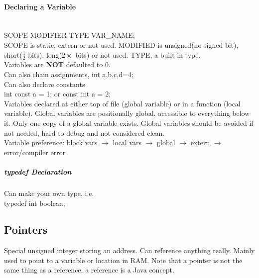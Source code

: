 \documentclass[12 pt]{article}
\begin{document}
\paragraph{Declaring a Variable}
~\\ SCOPE MODIFIER TYPE VAR\_NAME;
\\ SCOPE is static, extern or not used. MODIFIED is unsigned(no signed bit), short($\frac{1}{2}$ bits), long($2\times $ bits) or not used. TYPE, a built in type.
\\ Variables are \textbf{NOT} defaulted to 0.
\\ Can also chain assignments, int a,b,c,d=4;
\\ Can also declare constants
\\ int const a = 1; or const int a = 2;
\\ Variables declared at either top of file (global variable) or in a function (local variable). Global variables are positionally global, accessible to everything below it. Only one copy of a global variable exists. Global variables should be avoided if not needed, hard to debug and not considered clean.
\\ Variable preference: block vars $\to$ local vars $\to$ global $\to$ extern $\to$ error/compiler error
\subparagraph{typedef Declaration} Can make your own type, i.e.
\\ typedef int boolean;
\subsection{Pointers} Special unsigned integer storing an address. Can reference anything really. Mainly used to point to a variable or location in RAM. Note that a pointer is not the same thing as a reference, a reference is a Java concept.
\end{document}
